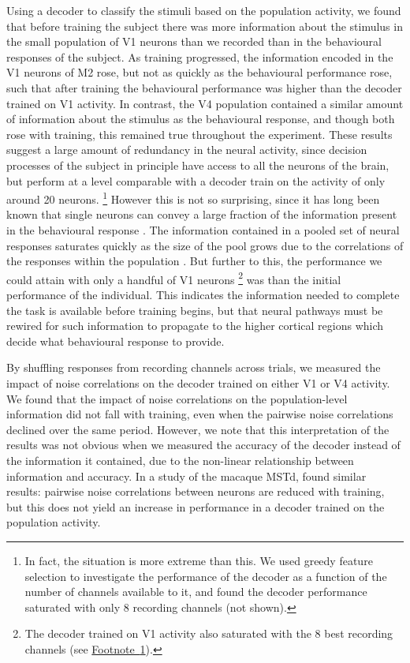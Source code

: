Using a decoder to classify the stimuli based on the population activity, we found that before training the subject there was more information about the stimulus in the small population of \ac{V1} neurons than we recorded than in the behavioural responses of the subject.
As training progressed, the information encoded in the \ac{V1} neurons of \ac{M2} rose, but not as quickly as the behavioural performance rose, such that after training the behavioural performance was higher than the decoder trained on \ac{V1} activity.
In contrast, the \ac{V4} population contained a similar amount of information about the stimulus as the behavioural response, and though both rose with training, this remained true throughout the experiment.
These results suggest a large amount of redundancy in the neural activity, since decision processes of the subject in principle have access to all the neurons of the brain, but perform at a level comparable with a decoder train on the activity of only around \num{20} neurons.%
\footnote{
\label{foot:pl_decoder_saturation}
In fact, the situation is more extreme than this.
We used greedy feature selection to investigate the performance of the decoder as a function of the number of channels available to it, and found the decoder performance saturated with only \num{8} recording channels (not shown).
}
However this is not so surprising, since it has long been known that single neurons can convey a large fraction of the information present in the behavioural response \citep{Britten1992}.
The information contained in a pooled set of neural responses saturates quickly as the size of the pool grows due to the correlations of the responses within the population \citep{Zohary1994}.
But further to this, the performance we could attain with only a handful of \ac{V1} neurons%
\footnote{
The decoder trained on \ac{V1} activity also saturated with the \num{8} best recording channels (see \hyperref[foot:pl_decoder_saturation]{Footnote~\ref{foot:pl_decoder_saturation}}).
}
was  than the initial performance of the individual.
This indicates the information needed to complete the task is available before training begins, but that neural pathways  must be rewired for such information to propagate to the higher cortical regions which decide what behavioural response to provide.

By shuffling responses from recording channels across trials, we measured the impact of noise correlations on the decoder trained on either \ac{V1} or \ac{V4} activity.
We found that the impact of noise correlations on the population-level information did not fall with training, even when the pairwise noise correlations declined over the same period.
However, we note that this interpretation of the results was not obvious when we measured the accuracy of the decoder instead of the information it contained, due to the non-linear relationship between information and accuracy.
In a study of the macaque \ac{MSTd}, \citet{Gu2011} found similar results: pairwise noise correlations between neurons are reduced with training, but this does not yield an increase in performance in a decoder trained on the population activity.


